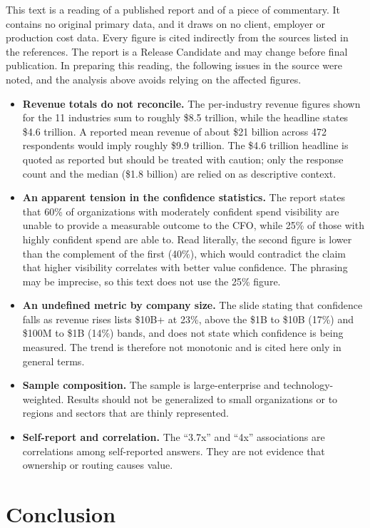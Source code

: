 \documentclass[11pt,a4paper]{article}
\begin{document}
This text is a reading of a published report and of a piece of commentary. It contains no original primary data, and it draws on no client, employer or production cost data. Every figure is cited indirectly from the sources listed in the references. The report is a Release Candidate and may change before final publication. In preparing this reading, the following issues in the source were noted, and the analysis above avoids relying on the affected figures.

\begin{itemize}[leftmargin=1.4em, itemsep=0.2em]
\item \textbf{Revenue totals do not reconcile.} The per-industry revenue figures shown for the 11 industries sum to roughly \$8.5 trillion, while the headline states \$4.6 trillion. A reported mean revenue of about \$21 billion across 472 respondents would imply roughly \$9.9 trillion. The \$4.6 trillion headline is quoted as reported but should be treated with caution; only the response count and the median (\$1.8 billion) are relied on as descriptive context.
\item \textbf{An apparent tension in the confidence statistics.} The report states that 60\% of organizations with moderately confident spend visibility are unable to provide a measurable outcome to the CFO, while 25\% of those with highly confident spend are able to. Read literally, the second figure is lower than the complement of the first (40\%), which would contradict the claim that higher visibility correlates with better value confidence. The phrasing may be imprecise, so this text does not use the 25\% figure.
\item \textbf{An undefined metric by company size.} The slide stating that confidence falls as revenue rises lists \$10B+ at 23\%, above the \$1B to \$10B (17\%) and \$100M to \$1B (14\%) bands, and does not state which confidence is being measured. The trend is therefore not monotonic and is cited here only in general terms.
\item \textbf{Sample composition.} The sample is large-enterprise and technology-weighted. Results should not be generalized to small organizations or to regions and sectors that are thinly represented.
\item \textbf{Self-report and correlation.} The ``3.7x'' and ``4x'' associations are correlations among self-reported answers. They are not evidence that ownership or routing causes value.
\end{itemize}

\section{Conclusion}
\end{document}
